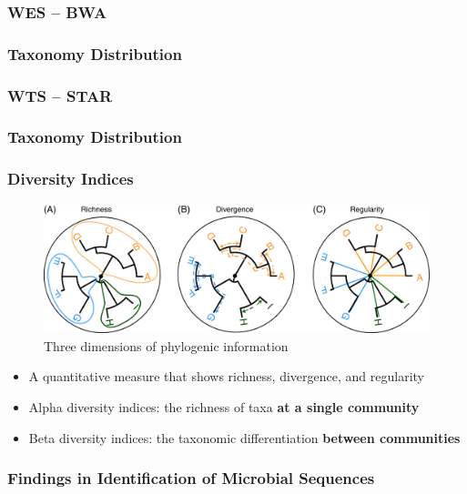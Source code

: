 \documentclass{beamer}
\begin{document}
    \subsubsection{WES -- BWA}
    \begin{frame}
        \frametitle{Taxonomy Distribution}
    \end{frame}

    \subsubsection{WTS -- STAR}
    \begin{frame}
        \frametitle{Taxonomy Distribution}
    \end{frame}

    \begin{frame}
        \frametitle{Diversity Indices}

        \begin{figure}
            \includegraphics[width=0.6 \linewidth]{figures/PathSeq/phylogenic.jpg}
            \caption{Three dimensions of phylogenic information \protect\cite{phylogenetic1}}
        \end{figure}

        \begin{itemize}
            \item A quantitative measure that shows richness, divergence, and regularity \cite{phylogenetic1}
            \item Alpha diversity indices: the richness of taxa \textbf{at a single community}
            \item Beta diversity indices: the taxonomic differentiation \textbf{between communities}
        \end{itemize}
    \end{frame}

    \begin{frame}
        \frametitle{Findings in Identification of Microbial Sequences}
    \end{frame}
\end{document}
